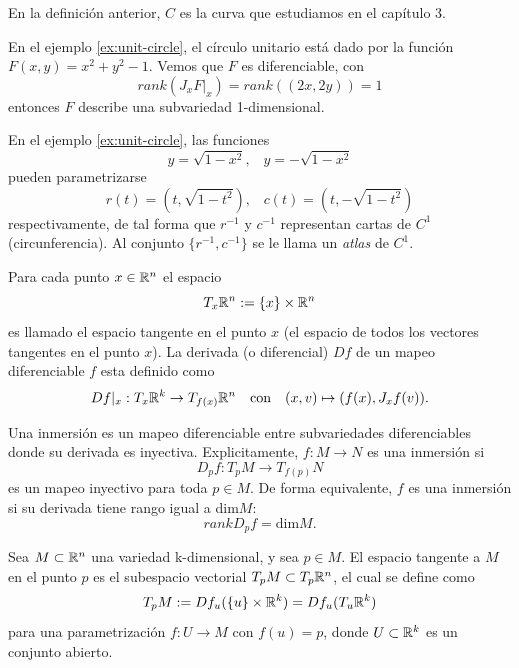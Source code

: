 En la definici\'on anterior, $C$ es la curva que estudiamos en el cap\'itulo 3.

\begin{example}
    En el ejemplo \ref{ex:unit-circle}, el c\'irculo unitario est\'a dado por la funci\'on
    $F(x,y)=x^{2}+y^{2}-1$. Vemos que $F$ es diferenciable,
    con
    $$ rank(J_{x}F|_{x})=rank((2x,2y))=1 $$
    entonces $F$ describe una subvariedad 1-dimensional.
\end{example}

\begin{example}
    En el ejemplo \ref{ex:unit-circle}, las funciones 
    $$y = \sqrt{1-x^{2}} \text{,} \quad y = -\sqrt{1-x^{2}}$$
    pueden parametrizarse
    $$ r(t)=(t,\sqrt{1-t^{2}}) \text{,} \quad c(t)=(t,-\sqrt{1-t^{2}}) $$
    respectivamente, de tal forma que $r^{-1}$ y $c^{-1}$ representan cartas
    de $C^{1}$ (circunferencia). Al conjunto $\{r^{-1}, c^{-1}\}$ se le llama
    un \emph{atlas} de $C^{1}$.
\end{example}

\begin{definition}
    Para cada punto $x \in \mathbb{R}^{n}$ el espacio
    $$ T_{x}\mathbb{R}^{n} := \{x\} \times \mathbb{R}^{n} $$
    es llamado el espacio tangente en el punto $x$ (el espacio de todos los vectores
    tangentes en el punto $x$). La derivada (o diferencial) $Df$ de un mapeo diferenciable
    $f$ esta definido como
    $$ Df|_{x}: T_{x}\mathbb{R}^{k} \rightarrow T_{f(x)}\mathbb{R}^{n} \quad \text{con} \quad
    (x,v) \mapsto (f(x),J_{x}f(v)) \text{.} $$
\end{definition}

\begin{definition}\label{def:immersion}
    Una inmersi\'on es un mapeo diferenciable entre subvariedades diferenciables donde su
    derivada es inyectiva. Explicitamente, $f:M \rightarrow N$ es una inmersi\'on si
    $$ D_{p}f: T_{p}M \rightarrow T_{f(p)}N $$
    es un mapeo inyectivo para toda $p \in M$. De forma equivalente, $f$ es una inmersi\'on
    si su derivada tiene rango igual a dim$M$:
    $$ rank D_{p}f = \text{dim}M \text{.} $$
\end{definition}

\begin{definition}
    Sea $M \subset \mathbb{R}^{n}$ una variedad k-dimensional, y sea $p \in M$. El
    espacio tangente a $M$ en el punto $p$ es el subespacio vectorial $T_{p}M \subset T_{p}\mathbb{R}^{n}$,
    el cual se define como
    $$ T_{p}M := Df_{u}(\{u\} \times \mathbb{R}^{k})=Df_{u}(T_{u}\mathbb{R}^{k}) $$
    para una parametrizaci\'on $f:U \rightarrow M$ con $f(u) = p$, donde $U \subset \mathbb{R}^{k}$ es
    un conjunto abierto.
\end{definition}

